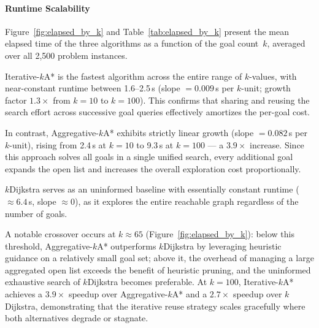 
\paragraph{Runtime Scalability}
Figure~\ref{fig:elapsed_by_k} and Table~\ref{tab:elapsed_by_k}
present the mean elapsed time of the three algorithms as a function
of the goal count~$k$, averaged over all 2{,}500 problem instances.

Iterative-$k$A* is the fastest algorithm across the entire range of
$k$-values, with near-constant runtime between 1.6--2.5\,s
(slope $= 0.009$\,s per $k$-unit; growth factor $1.3{\times}$ from
$k{=}10$ to $k{=}100$). This confirms that sharing and reusing the
search effort across successive goal queries effectively amortizes
the per-goal cost.

In contrast, Aggregative-$k$A* exhibits strictly linear growth
(slope $= 0.082$\,s per $k$-unit), rising from 2.4\,s at $k{=}10$ to
9.3\,s at $k{=}100$ --- a $3.9{\times}$ increase. Since this approach
solves all goals in a single unified search, every additional goal
expands the open list and increases the overall exploration cost
proportionally.

$k$Dijkstra serves as an uninformed baseline with essentially
constant runtime (${\approx}6.4$\,s, slope $\approx 0$), as it
explores the entire reachable graph regardless of the number of goals.

A notable crossover occurs at $k \approx 65$
(Figure~\ref{fig:elapsed_by_k}): below this threshold,
Aggregative-$k$A* outperforms $k$Dijkstra by leveraging heuristic
guidance on a relatively small goal set; above it, the overhead of
managing a large aggregated open list exceeds the benefit of heuristic
pruning, and the uninformed exhaustive search of $k$Dijkstra becomes
preferable. At $k{=}100$, Iterative-$k$A* achieves a $3.9{\times}$
speedup over Aggregative-$k$A* and a $2.7{\times}$ speedup over
$k$Dijkstra, demonstrating that the iterative reuse strategy scales
gracefully where both alternatives degrade or stagnate.
